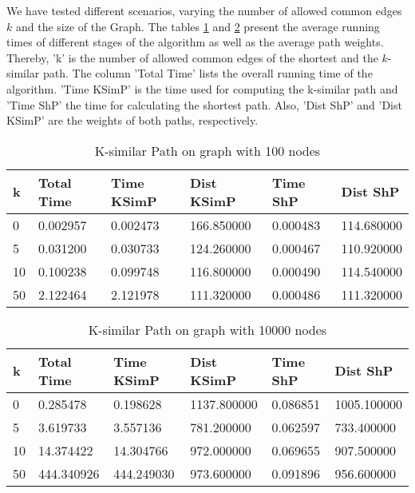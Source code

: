 \documentclass[]{article}
\numberwithin{equation}{section}
\begin{document}
We have tested different scenarios, varying the number of allowed common edges $k$ and the size of the Graph. The tables \ref{table:ksim} and \ref{table:ksim2} present the average running times of different stages of the algorithm as well as the average path weights. Thereby, 'k' is the number of allowed common edges of the shortest and the $k$-similar path. The column 'Total Time' lists the overall running time of the algorithm. 'Time KSimP' is the time used for computing the k-similar path and 'Time ShP' the time for calculating the shortest path. Also, 'Dist ShP' and 'Dist KSimP' are the weights of both paths, respectively.

\begin{table}[H]
	\centering
	\setlength\tabcolsep{2pt}
	\begin{tabular}{|l|l|l|l|l|l|}
		\hline
		k  & Total Time & Time KSimP & Dist KSimP & Time ShP & Dist ShP   \\ \hline
		0  & 0.002957   & 0.002473   & 166.850000 & 0.000483 & 114.680000 \\ \hline
		5  & 0.031200   & 0.030733   & 124.260000 & 0.000467 & 110.920000 \\ \hline
		10 & 0.100238   & 0.099748   & 116.800000 & 0.000490 & 114.540000 \\ \hline
		50 & 2.122464   & 2.121978   & 111.320000 & 0.000486 & 111.320000 \\ \hline
	\end{tabular}
	\caption{K-similar Path on graph with 100 nodes}
	\label{table:ksim}
\end{table}

\begin{table}[H]
	\centering
	\setlength\tabcolsep{2pt}
	\begin{tabular}{|l|l|l|l|l|l|}
		\hline
		k  & Total Time & Time KSimP & Dist KSimP  & Time ShP & Dist ShP     \\ \hline
		0  & 0.285478   & 0.198628   & 1137.800000 & 0.086851 & 1005.100000  \\ \hline
		5  & 3.619733   & 3.557136   & 781.200000  & 0.062597 & 733.400000   \\ \hline
		10 & 14.374422  & 14.304766  & 972.000000  & 0.069655 & 907.500000   \\ \hline
		50 & 444.340926 & 444.249030 & 973.600000  & 0.091896 & 956.600000   \\ \hline
	\end{tabular}
	\caption{K-similar Path on graph with 10000 nodes}
	\label{table:ksim2}
\end{table}
\end{document}
